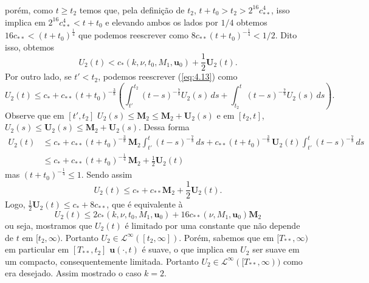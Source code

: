 \documentclass[a4paper, 11pt]{book}
\theoremstyle{definition}
\newcommand{\bu}{\mathbf{u}}
\newcommand{\cL}{\mathcal{L}}
\begin{document}
\begin{prf}
\[\begin{aligned}
        \end{aligned}
    \]
    porém, como $t \geqslant t_2$ temos que, pela definição de $t_2$, $t + t_0 > t_2 > 2^{16} c_{**}^4$, isso implica em $2^{16} c_{**}^4 < t + t_0$ e elevando ambos os lados por $1/4$ obtemos $16 c_{**} < (t + t_0)^{\frac{1}{4}}$ que podemos reescrever como $8c_{**} (t + t_0)^{-\frac{1}{4}} < 1/2$. Dito isso, obtemos
    \[
        U_2(t) < c_*(k,\nu,t_0,M_1, \bu_0) + \frac{1}{2} \mathbf{U}_2(t).
    \]
    Por outro lado, se $t'< t_2$, podemos reescrever (\ref{eq:4.13}) como
    \[
        U_2(t) \leqslant c_* + c_{**} (t + t_0)^{-\frac{3}{8}} \left( \int_{t'}^{t_2} (t - s)^{-\frac{7}{8}} U_2(s) \,ds + \int_{t_2}^t (t - s)^{-\frac{7}{8}}U_2(s) \,ds \right).
    \]
    Observe que em $[t',t_2]$ $U_2(s) \leqslant \mathbf{M}_2 \leqslant \mathbf{M}_2 + \mathbf{U}_2(s)$ e em $[t_2, t]$, $U_2(s) \leqslant \mathbf{U}_2(s) \leqslant \mathbf{M}_2 + \mathbf{U}_2(s)$.
    Dessa forma
    \[
        \begin{aligned}
            U_2(t) &\leqslant c_* + c_{**} (t + t_0)^{-\frac{3}{8}} \, \mathbf{M}_2\int_{t'}^{t} (t - s)^{-\frac{7}{8}}\,ds + c_{**} (t + t_0)^{-\frac{3}{8}}\,\mathbf{U}_2(t)\int_{t'}^{t} (t - s)^{-\frac{7}{8}}\,ds\\
            &\leqslant c_* + c_{**} (t+ t_0)^{-\frac{1}{4}}\, \mathbf{M}_2 + \frac{1}{2} \mathbf{U}_2(t)
        \end{aligned}
    \]
    mas $(t + t_0)^{-\frac{1}{4}} \leqslant 1$. Sendo assim
    \[
        U_2(t) \leqslant c_* + c_{**} \mathbf{M}_2 + \frac{1}{2} \mathbf{U}_2(t).
    \]
    Logo, $\frac{1}{2}\mathbf{U}_2(t) \leqslant c_{*} + 8 c_{**}$, que é equivalente à
    \[
        U_2(t) \leqslant 2c_{*}(k,\nu,t_0, M_1, \bu_0) + 16c_{**}(\nu,M_1, \bu_0) \mathbf{M}_2
    \]
    ou seja, mostramos que $U_2(t)$ é limitado por uma constante que não depende de $t$ em $[t_2, \infty)$. Portanto $U_2 \in \cL^\infty([t_2, \infty])$. Porém, sabemos que em $[T_{**}, \infty)$ em particular em $[T_{**}, t_2]$ $\bu(\cdot,t)$ é suave, o que implica em $U_2$ ser suave em um compacto, consequentemente limitada.
    Portanto $U_2 \in \cL^\infty([T_{**},\infty))$ como era desejado. Assim mostrado o caso $k = 2$.


\end{prf}
\end{document}
